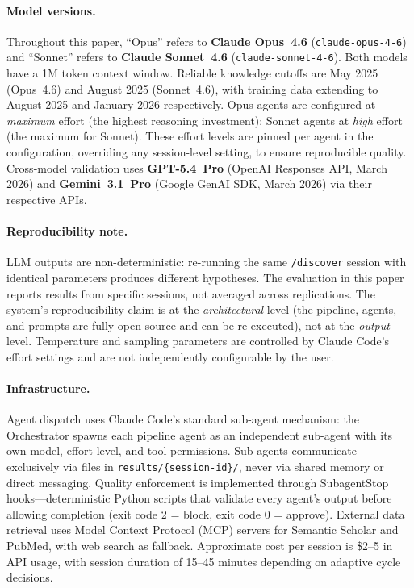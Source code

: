 \paragraph{Model versions.} Throughout this paper, ``Opus'' refers to \textbf{Claude Opus~4.6} (\texttt{claude-opus-4-6}) and ``Sonnet'' refers to \textbf{Claude Sonnet~4.6} (\texttt{claude-sonnet-4-6}). Both models have a 1M token context window. Reliable knowledge cutoffs are May 2025 (Opus~4.6) and August 2025 (Sonnet~4.6), with training data extending to August 2025 and January 2026 respectively. Opus agents are configured at \emph{maximum} effort (the highest reasoning investment); Sonnet agents at \emph{high} effort (the maximum for Sonnet). These effort levels are pinned per agent in the configuration, overriding any session-level setting, to ensure reproducible quality. Cross-model validation uses \textbf{GPT-5.4~Pro} (OpenAI Responses API, March 2026) and \textbf{Gemini~3.1~Pro} (Google GenAI SDK, March 2026) via their respective APIs.

\paragraph{Reproducibility note.} LLM outputs are non-deterministic: re-running the same \texttt{/discover} session with identical parameters produces different hypotheses. The evaluation in this paper reports results from specific sessions, not averaged across replications. The system's reproducibility claim is at the \emph{architectural} level (the pipeline, agents, and prompts are fully open-source and can be re-executed), not at the \emph{output} level. Temperature and sampling parameters are controlled by Claude Code's effort settings and are not independently configurable by the user.

\paragraph{Infrastructure.} Agent dispatch uses Claude Code's standard sub-agent mechanism: the Orchestrator spawns each pipeline agent as an independent sub-agent with its own model, effort level, and tool permissions. Sub-agents communicate exclusively via files in \texttt{results/\{session-id\}/}, never via shared memory or direct messaging. Quality enforcement is implemented through SubagentStop hooks---deterministic Python scripts that validate every agent's output before allowing completion (exit code 2 = block, exit code 0 = approve). External data retrieval uses Model Context Protocol (MCP) servers for Semantic Scholar and PubMed, with web search as fallback. Approximate cost per session is \$2--5 in API usage, with session duration of 15--45 minutes depending on adaptive cycle decisions.

